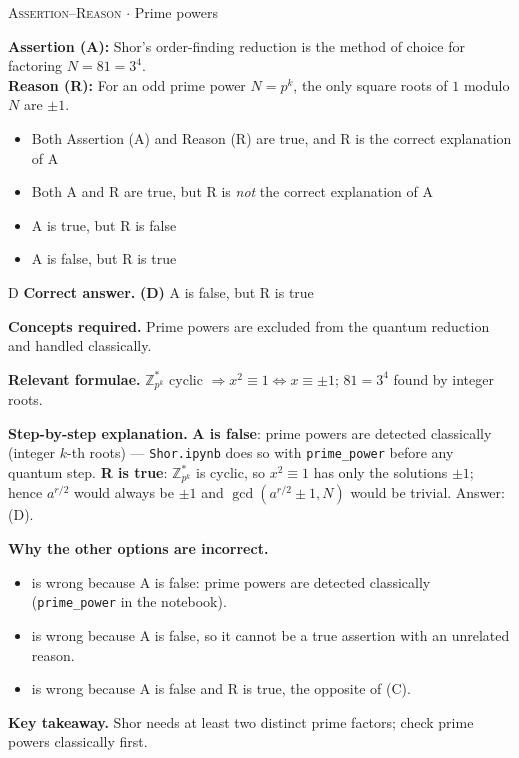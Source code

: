 \documentclass[11pt,a4paper]{article}
\newcommand{\optlabel}[1]{\textbf{(#1)}}
\newcommand{\correctlabel}[1]{\textcolor{okgreen}{\textbf{(#1)}\,\ding{51}}}
\newenvironment{qitem}[1]{\begin{list}{}{\setlength{\leftmargin}{3.3em}\setlength{\labelwidth}{3.1em}%
  \setlength{\labelsep}{0.2em}\setlength{\topsep}{3pt}\setlength{\parsep}{3pt}}\item[\textbf{Q.#1}\hfill]}{\end{list}}
\newcommand{\qsep}{\par\vspace{2pt}{\color{black!15}\hrule}\vspace{4pt}}
\newcommand{\qmeta}[2]{{\footnotesize\color{black!60}\textsc{#1} \;$\cdot$\; #2}\par}
\begin{document}
\qsep

\begin{qitem}{57}
\qmeta{Assertion--Reason}{Prime powers}
\textbf{Assertion (A):} Shor's order-finding reduction is the method of choice for factoring $N = 81 = 3^4$.\\[1mm]
\textbf{Reason (R):} For an odd prime power $N = p^k$, the only square roots of $1$ modulo $N$ are $\pm1$.
\begin{itemize}[leftmargin=2.6em, labelsep=0.4em, itemsep=2pt, topsep=3pt]
\item[\optlabel{A}] Both Assertion (A) and Reason (R) are true, and R is the correct explanation of A
\item[\optlabel{B}] Both A and R are true, but R is \emph{not} the correct explanation of A
\item[\optlabel{C}] A is true, but R is false
\item[\correctlabel{D}] A is false, but R is true
\end{itemize}
\end{qitem}
\begin{solbox}{D}
\textbf{\color{brand}Correct answer.} \textcolor{okgreen}{\textbf{(D)}} A is false, but R is true

\textbf{\color{brand}Concepts required.} Prime powers are excluded from the quantum reduction and handled classically.

\textbf{\color{brand}Relevant formulae.} $\mathbb Z_{p^k}^*$ cyclic $\Rightarrow x^2 \equiv 1 \iff x \equiv \pm1$; $81 = 3^4$ found by integer roots.

\textbf{\color{brand}Step-by-step explanation.} \textbf{A is false}: prime powers are detected classically (integer $k$-th roots) --- \texttt{Shor.ipynb} does so with \texttt{prime\_power} before any quantum step.
\textbf{R is true}: $\mathbb Z_{p^k}^*$ is cyclic, so $x^2 \equiv 1$ has only the solutions $\pm1$; hence $a^{r/2}$ would always be $\pm1$ and $\gcd(a^{r/2} \pm 1, N)$ would
be trivial. Answer: (D).

\textbf{\color{brand}Why the other options are incorrect.}
\begin{itemize}[leftmargin=2.4em, itemsep=1pt, topsep=2pt]
\item[\textbf{(A)}] is wrong because A is false: prime powers are detected classically (\texttt{prime\_power} in the notebook).
\item[\textbf{(B)}] is wrong because A is false, so it cannot be a true assertion with an unrelated reason.
\item[\textbf{(C)}] is wrong because A is false and R is true, the opposite of (C).
\end{itemize}
\textbf{\color{brand}Key takeaway.} Shor needs at least two distinct prime factors; check prime powers classically first.
\end{solbox}
\qsep
\end{document}
